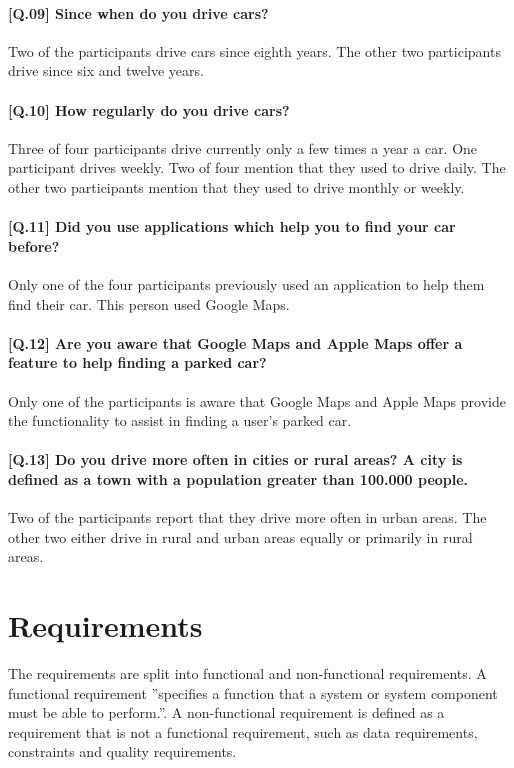 \paragraph{[Q.09] Since when do you drive cars?}
Two of the participants drive cars since eighth years. The other two participants drive since six and twelve years.

\paragraph{[Q.10] How regularly do you drive cars?}
Three of four participants drive currently only a few times a year a car. One participant drives weekly. Two of four mention that they used to drive daily. The other two participants mention that they used to drive monthly or weekly. 

\paragraph{[Q.11] Did you use applications which help you to find your car before?}
Only one of the four participants previously used an application to help them find their car. This person used Google Maps.

\paragraph{[Q.12] Are you aware that Google Maps and Apple Maps offer a feature to help finding a parked car?}
Only one of the participants is aware that Google Maps and Apple Maps provide the functionality to assist in finding a user's parked car. 

\paragraph{[Q.13] Do you drive more often in cities or rural areas? A city is defined as a town with a population greater than 100.000 people.}
Two of the participants report that they drive more often in urban areas. The other two either drive in rural and urban areas equally or primarily in rural areas.


\section{Requirements}
The requirements are split into functional and non-functional requirements. A functional requirement ''specifies a function that a system or system component must be able to perform.''. A non-functional requirement is defined as a requirement that is not a functional requirement, such as data requirements, constraints and quality requirements. \cite{eide2005quantification}

